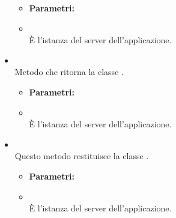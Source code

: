 \begin{itemize}
\begin{itemize}
\item[] \textbf{Parametri:}
\item[]  \\ È l'istanza del server dell'applicazione.
\end{itemize}
\item[] \textbf{} \\ Metodo che ritorna la classe .
\begin{itemize}\addtolength{\itemsep}{-0.5\baselineskip}
\item[] \textbf{Parametri:}
\item[]  \\ È l'istanza del server dell'applicazione.
\end{itemize}
\item[] \textbf{} \\ Questo metodo restituisce la classe .
\begin{itemize}\addtolength{\itemsep}{-0.5\baselineskip}
\item[] \textbf{Parametri:}
\item[]  \\ È l'istanza del server dell'applicazione.
\end{itemize}
\end{itemize}

